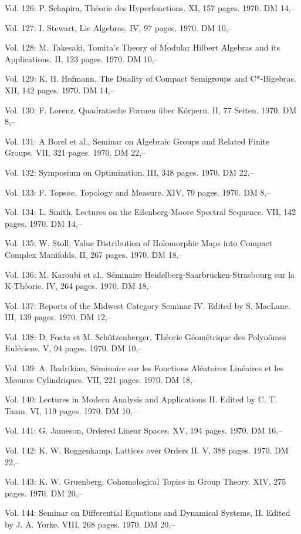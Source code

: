 Vol. 126: P. Schapira, Théorie des Hyperfonctions. XI, 157 pages. 1970. DM 14,--

Vol. 127: I. Stewart, Lie Algebras. IV, 97 pages. 1970. DM 10,--

Vol. 128: M. Takesaki, Tomita's Theory of Modular Hilbert Algebras and its Applications. II, 123 pages. 1970. DM 10,--

Vol. 129: K. H. Hofmann, The Duality of Compact Semigroups and C*-Bigebras. XII, 142 pages. 1970. DM 14,--

Vol. 130: F. Lorenz, Quadratische Formen über Körpern. II, 77 Seiten. 1970. DM 8,--

Vol. 131: A Borel et al., Seminar on Algebraic Groups and Related Finite Groups. VII, 321 pages. 1970. DM 22,--

Vol. 132: Symposium on Optimization. III, 348 pages. 1970. DM 22,--

Vol. 133: F. Topsøe, Topology and Measure. XIV, 79 pages. 1970. DM 8,--

Vol. 134: L. Smith, Lectures on the Eilenberg-Moore Spectral Sequence. VII, 142 pages. 1970. DM 14,--

Vol. 135: W. Stoll, Value Distribution of Holomorphic Maps into Compact Complex Manifolds. II, 267 pages. 1970. DM 18,--

Vol. 136: M. Karoubi et al., Séminaire Heidelberg-Saarbrücken-Strasbourg sur la K-Théorie. IV, 264 pages. 1970. DM 18,--

Vol. 137: Reports of the Midwest Category Seminar IV. Edited by S. MacLane. III, 139 pages. 1970. DM 12,--

Vol. 138: D. Foata et M. Schützenberger, Théorie Géométrique des Polynômes Eulériens. V, 94 pages. 1970. DM 10,--

Vol. 139: A. Badrikian, Séminaire sur les Fonctions Aléatoires Linéaires et les Mesures Cylindriques. VII, 221 pages. 1970. DM 18,--

Vol. 140: Lectures in Modern Analysis and Applications II. Edited by C. T. Taam. VI, 119 pages. 1970. DM 10,--

Vol. 141: G. Jameson, Ordered Linear Spaces. XV, 194 pages. 1970. DM 16,--

Vol. 142: K. W. Roggenkamp, Lattices over Orders II. V, 388 pages. 1970. DM 22,--

Vol. 143: K. W. Gruenberg, Cohomological Topics in Group Theory. XIV, 275 pages. 1970. DM 20,--

Vol. 144: Seminar on Differential Equations and Dynamical Systems, II. Edited by J. A. Yorke. VIII, 268 pages. 1970. DM 20,--

